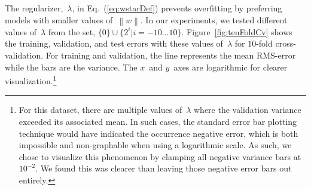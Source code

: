 \documentclass{report}
\newcommand{\eref}[1]{(\ref{#1})}
\newcommand{\norm}[1]{\left\lVert#1\right\rVert}
\begin{document}
  The regularizer,~$\lambda$, in Eq.~\eref{eq:wstarDef} prevents overfitting by preferring models with smaller values of~$\norm{w}$.  In our experiments, we tested different values of~$\lambda$ from the set, ${\{0\} \cup \{2^{i} | i=-10...10\}}$.  Figure~\ref{fig:tenFoldCv} shows the training, validation, and test errors with these values of~$\lambda$ for $10$-fold cross-validation.  For training and validation, the line represents the mean RMS-error while the bars are the variance.  The $x$~and $y$~axes are logarithmic for clearer visualization.\footnote{For this dataset, there are multiple values of~$\lambda$ where the validation variance exceeded its associated mean.  In such cases, the standard error bar plotting technique would have indicated the occurrence negative error, which is both impossible and non-graphable when using a logarithmic scale.  As such, we chose to visualize this phenomenon by clamping all negative variance bars at~$10^{-2}$.  We found this was clearer than leaving those negative error bars out entirely.}
  
\end{document}
